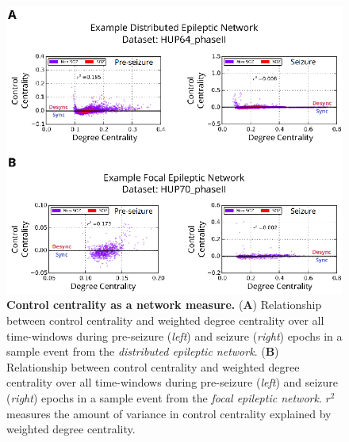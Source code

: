 \begin{figure}[H]
    \centering
    \includegraphics[width=\textwidth]{panelS1.eps}
    \caption[Control centrality as a network measure]{\textbf{Control centrality as a network measure.} (\textbf{A}) Relationship between control centrality and weighted degree centrality over all time-windows during pre-seizure (\textit{left}) and seizure (\textit{right}) epochs in a sample event from the \textit{distributed epileptic network}. (\textbf{B}) Relationship between control centrality and weighted degree centrality over all time-windows during pre-seizure (\textit{left}) and seizure (\textit{right}) epochs in a sample event from the \textit{focal epileptic network}. $r^2$ measures the amount of variance in control centrality explained by weighted degree centrality. \label{ch5:figS1}}
\end{figure}
